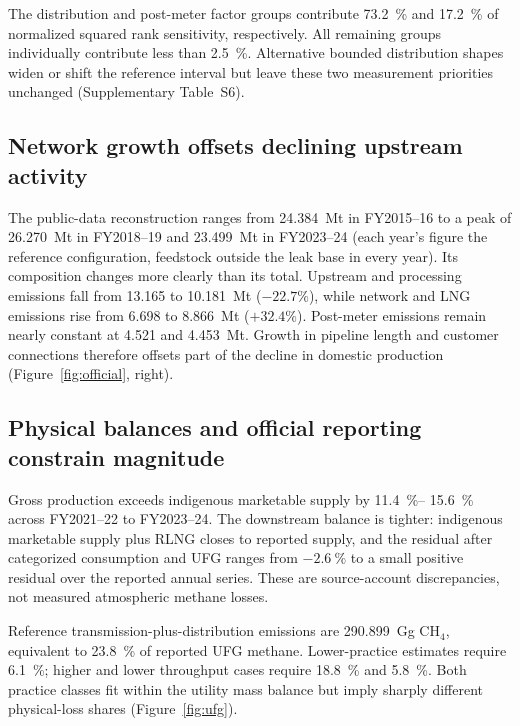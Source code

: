 The distribution and post-meter factor groups contribute \SI{73.2}{\percent} and
\SI{17.2}{\percent} of normalized squared rank sensitivity, respectively. All remaining groups
individually contribute less than \SI{2.5}{\percent}. Alternative bounded distribution shapes
widen or shift the reference interval but leave these two measurement priorities unchanged
(Supplementary Table~S6).

\subsection{Network growth offsets declining upstream activity}

The public-data reconstruction ranges from \SI{24.384}{\mega\tonne} in FY2015--16 to a peak of
\SI{26.270}{\mega\tonne} in FY2018--19 and \SI{23.499}{\mega\tonne} in FY2023--24 (each
year's figure the reference configuration, feedstock outside the leak base in every year).
Its composition changes more clearly than its total. Upstream and processing emissions fall from
\SI{13.165}{} to \SI{10.181}{\mega\tonne} ($-22.7\%$), while network and LNG emissions rise
from \SI{6.698}{} to \SI{8.866}{\mega\tonne} ($+32.4\%$). Post-meter emissions remain nearly
constant at \SI{4.521}{} and \SI{4.453}{\mega\tonne}. Growth in pipeline length and customer
connections therefore offsets part of the decline in domestic production
(Figure~\ref{fig:official}, right).

\subsection{Physical balances and official reporting constrain magnitude}

Gross production exceeds indigenous marketable supply by \SI{11.4}{\percent}--
\SI{15.6}{\percent} across FY2021--22 to FY2023--24. The downstream balance is tighter:
indigenous marketable supply plus RLNG closes to reported supply, and the residual after
categorized consumption and UFG ranges from $-\SI{2.6}{\percent}$ to
a small positive residual over the reported annual series. These are source-account discrepancies, not measured atmospheric methane losses.

Reference transmission-plus-distribution emissions are \SI{290.899}{\giga\gram} CH$_4$,
equivalent to \SI{23.8}{\percent} of reported UFG methane. Lower-practice estimates require
\SI{6.1}{\percent}; higher and lower throughput cases require \SI{18.8}{\percent} and
\SI{5.8}{\percent}. Both practice classes fit within the utility mass balance but imply sharply
different physical-loss shares (Figure~\ref{fig:ufg}).

